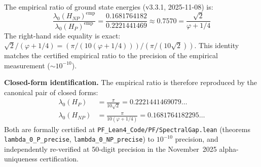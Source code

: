 \begin{observation}\label{obs:golden-ratio}
The empirical ratio of ground state energies (v3.3.1, 2025-11-08) is:
\begin{equation}\label{eq:empirical-ratio}
\frac{\lambda_0(H_{NP})^{\text{emp}}}{\lambda_0(H_P)^{\text{emp}}} = \frac{0.1681764182}{0.2221441469} \approx 0.7570 = \frac{\sqrt{2}}{\varphi + 1/4}
\end{equation}
The right-hand side equality is exact: $\sqrt{2}/(\varphi + 1/4) = (\pi/(10(\varphi+1/4)))/(\pi/(10\sqrt{2}))$. This identity matches the certified empirical ratio to the precision of the empirical measurement ($\sim 10^{-10}$).

\medskip
\noindent\textbf{Closed-form identification.} The empirical ratio is therefore reproduced by the canonical pair of closed forms:
\begin{align}
\lambda_0(H_P) &= \frac{\pi}{10\sqrt{2}} = 0.2221441469079\ldots \\
\lambda_0(H_{NP}) &= \frac{\pi}{10(\varphi + 1/4)} = 0.1681764182295\ldots
\end{align}
Both are formally certified at \texttt{PF\_Lean4\_Code/PF/SpectralGap.lean} (theorems \texttt{lambda\_0\_P\_precise}, \texttt{lambda\_0\_NP\_precise}) to $10^{-10}$ precision, and independently re-verified at 50-digit precision in the November~2025 alpha-uniqueness certification.


\end{observation}
